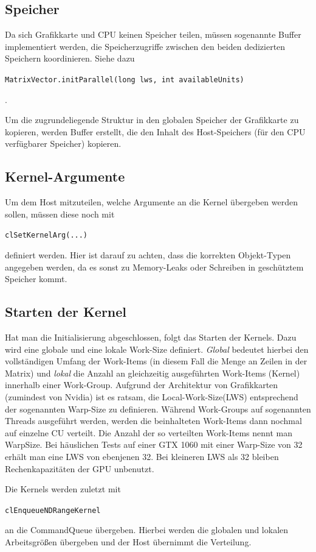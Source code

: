 \documentclass[
	ngerman,
	ruledheaders=section,
	class=report,
	thesis={type=Dokumentation},
	ignore-missing-data=true,
	accentcolor=9c,
	custommargins=false,
	marginpar=false,
	parskip=half-,
	fontsize=11pt,
]{tudapub}
\let\code\texttt
\def\code#1{\begin{small}\texttt{#1}\end{small}}
\begin{document}
\subsection{Speicher}
Da sich Grafikkarte und CPU keinen Speicher teilen, müssen sogenannte Buffer implementiert werden, die Speicherzugriffe zwischen den beiden dedizierten Speichern koordinieren. Siehe dazu \code{MatrixVector.initParallel(long lws, int availableUnits)}.

Um die zugrundeliegende Struktur in den globalen Speicher der Grafikkarte zu kopieren, werden Buffer erstellt, die den Inhalt des Host-Speichers (für den CPU verfügbarer Speicher) kopieren.

\subsection{Kernel-Argumente}
Um dem Host mitzuteilen, welche Argumente an die Kernel übergeben werden sollen, müssen diese noch mit \code{clSetKernelArg(...)} definiert werden. Hier ist darauf zu achten, dass die korrekten Objekt-Typen angegeben werden, da es sonst zu Memory-Leaks oder Schreiben in geschütztem Speicher kommt.

\subsection{Starten der Kernel}
Hat man die Initialisierung abgeschlossen, folgt das Starten der Kernels. Dazu wird eine globale und eine lokale Work-Size definiert. \textit{Global} bedeutet hierbei den vollständigen Umfang der Work-Items (in diesem Fall die Menge an Zeilen in der Matrix) und \textit{lokal} die Anzahl an gleichzeitig ausgeführten Work-Items (Kernel) innerhalb einer Work-Group. Aufgrund der Architektur von Grafikkarten (zumindest von Nvidia) ist es ratsam, die Local-Work-Size(LWS) entsprechend der sogenannten Warp-Size zu definieren. Während Work-Groups auf sogenannten Threads ausgeführt werden, werden die beinhalteten Work-Items dann nochmal auf einzelne CU verteilt. Die Anzahl der so verteilten Work-Items nennt man WarpSize. Bei häuslichen Tests auf einer GTX 1060 mit einer Warp-Size von 32 erhält man eine LWS von ebenjenen 32. Bei kleineren LWS als 32 bleiben Rechenkapazitäten der GPU unbenutzt.

Die Kernels werden zuletzt mit \code{clEnqueueNDRangeKernel} an die CommandQueue übergeben. Hierbei werden die globalen und lokalen Arbeitsgrößen übergeben und der Host übernimmt die Verteilung.
\end{document}
